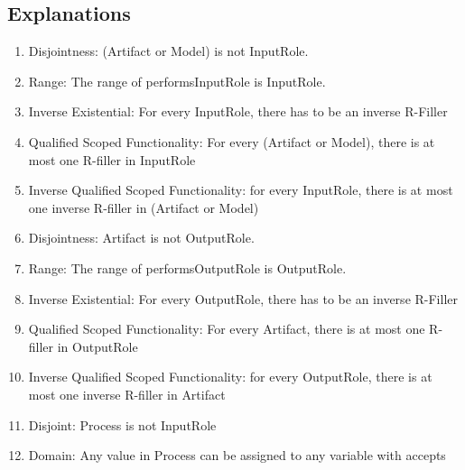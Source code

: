 \subsection{Explanations}
\label{exp:2a}
\begin{enumerate}
    \item  Disjointness: \textsf{(Artifact or Model)} is not \textsf{InputRole}.
    \item  Range: The range of \textsf{performsInputRole} is \textsf{InputRole}. 
    \item   Inverse Existential: For every \textsf{InputRole}, there has to be an inverse R-Filler %
    \item  Qualified Scoped Functionality: For every \textsf{(Artifact or Model)}, there is at most one R-filler in \textsf{InputRole} %
    \item  Inverse Qualified Scoped Functionality: for every \textsf{InputRole}, there is at most one inverse R-filler in \textsf{(Artifact or Model)} %
    \item  Disjointness: \textsf{Artifact} is not \textsf{OutputRole}.
    \item  Range: The range of \textsf{performsOutputRole} is \textsf{OutputRole}. 
    \item   Inverse Existential: For every \textsf{OutputRole}, there has to be an inverse R-Filler %
    \item  Qualified Scoped Functionality: For every \textsf{Artifact}, there is at most one R-filler in \textsf{OutputRole} %
    \item  Inverse Qualified Scoped Functionality: for every \textsf{OutputRole}, there is at most one inverse R-filler in \textsf{Artifact} %
    \item Disjoint: \textsf{Process} is not \textsf{InputRole}  %
    \item Domain: Any value in \textsf{Process} can be assigned to any variable with \textsf{accepts} %

\end{enumerate}
